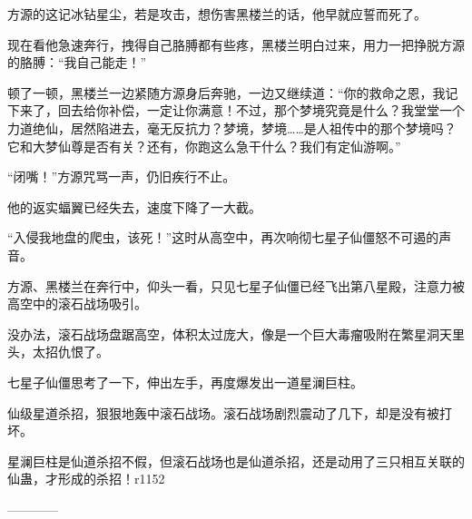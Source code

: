 \begin{this_body}
方源的这记冰钻星尘，若是攻击，想伤害黑楼兰的话，他早就应誓而死了。

现在看他急速奔行，拽得自己胳膊都有些疼，黑楼兰明白过来，用力一把挣脱方源的胳膊：“我自己能走！”

顿了一顿，黑楼兰一边紧随方源身后奔驰，一边又继续道：“你的救命之恩，我记下来了，回去给你补偿，一定让你满意！不过，那个梦境究竟是什么？我堂堂一个力道绝仙，居然陷进去，毫无反抗力？梦境，梦境……是人祖传中的那个梦境吗？它和大梦仙尊是否有关？还有，你跑这么急干什么？我们有定仙游啊。”

“闭嘴！”方源咒骂一声，仍旧疾行不止。

他的返实蝠翼已经失去，速度下降了一大截。

“入侵我地盘的爬虫，该死！”这时从高空中，再次响彻七星子仙僵怒不可遏的声音。

方源、黑楼兰在奔行中，仰头一看，只见七星子仙僵已经飞出第八星殿，注意力被高空中的滚石战场吸引。

没办法，滚石战场盘踞高空，体积太过庞大，像是一个巨大毒瘤吸附在繁星洞天里头，太招仇恨了。

七星子仙僵思考了一下，伸出左手，再度爆发出一道星澜巨柱。

仙级星道杀招，狠狠地轰中滚石战场。滚石战场剧烈震动了几下，却是没有被打坏。

星澜巨柱是仙道杀招不假，但滚石战场也是仙道杀招，还是动用了三只相互关联的仙蛊，才形成的杀招！r1152

------------

\end{this_body}

